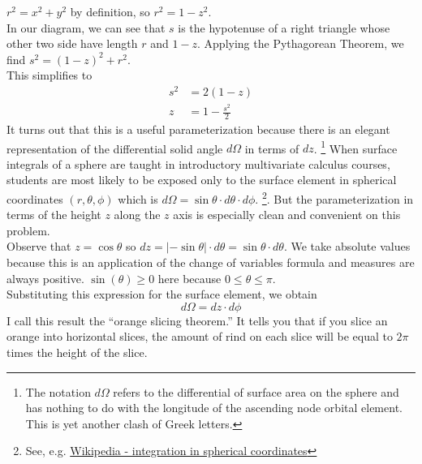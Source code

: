 $r^2 = x^2 + y^2$ by definition, so $r^2 = 1 - z^2$.\\
In our diagram, we can see that $s$ is the hypotenuse of a right triangle whose other two side have length $r$ and $1-z$.
Applying the Pythagorean Theorem, we find $s^2 = (1-z)^2 + r^2$.\\
This simplifies to
\begin{align*}
s^2 &= 2(1-z) \\
z &= 1 - \frac{s^2}{2}
\end{align*}
It turns out that this is a useful parameterization because there is an elegant representation
of the differential solid angle $d\Omega$ in terms of $dz$.
\footnote{The notation $d\Omega$ refers to the differential of surface area on the sphere 
and has nothing to do with the longitude of the ascending node orbital element.
This is yet another clash of Greek letters.}
When surface integrals of a sphere are taught in introductory multivariate calculus courses, 
students are most likely to be exposed only to the surface element in spherical coordinates $(r, \theta, \phi)$ which is
$d\Omega = \sin \theta \cdot d\theta \cdot d\phi$.
\footnote{See, e.g. \href{https://en.wikipedia.org/wiki/Spherical_coordinate_system}{Wikipedia - integration in spherical coordinates}}.
But the parameterization in terms of the height $z$ along the $z$ axis is especially clean and convenient on this problem.\\
Observe that $z = \cos \theta$ so $dz = |- \sin \theta| \cdot d\theta = \sin \theta \cdot d\theta$.  
We take absolute values because this is an application of the change of variables formula and measures are always positive. 
$\sin(\theta) \ge 0 $ here because $0 \le \theta \le \pi$.\\
Substituting this expression for the surface element, we obtain
$$ d\Omega = dz \cdot d\phi$$
I call this result the ``orange slicing theorem.''
It tells you that if you slice an orange into horizontal slices, the amount of rind on each slice will be equal to $2 \pi$ times the height of the slice.

